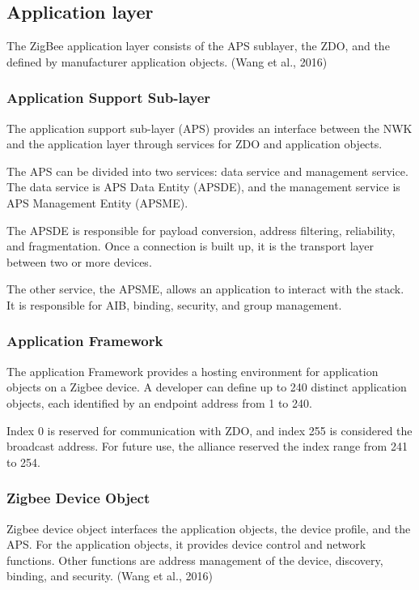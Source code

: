 \subsection{Application layer}

The ZigBee application layer consists of the APS sublayer, the ZDO, and the deﬁned by manufacturer application objects. (Wang et al., 2016)
\cite{nxp:2016}

\subsubsection{Application Support Sub-layer}

The application support sub-layer (APS) provides an interface between the NWK and the application layer through services for ZDO and application objects.

The APS can be divided into two services: data service and management service. The data service is APS Data Entity (APSDE), and the management service is APS Management Entity (APSME).

The APSDE is responsible for payload conversion, address filtering, reliability, and fragmentation. Once a connection is built up, it is the transport layer between two or more devices.

The other service, the APSME, allows an application to interact with the stack. It is responsible for AIB, binding, security, and group management.


\subsubsection{Application Framework}

The application Framework provides a hosting environment for application objects on a Zigbee device.
A developer can define up to 240 distinct application objects, each identified by an endpoint address from 1 to 240.

Index 0 is reserved for communication with ZDO, and index 255 is considered the broadcast address.
For future use, the alliance reserved the index range from 241 to 254.

\subsubsection{Zigbee Device Object}
Zigbee device object interfaces the application objects, the device profile, and the APS. For the application objects, it provides device control and network functions. Other functions are address management of the device, discovery, binding, and security. (Wang et al., 2016)

